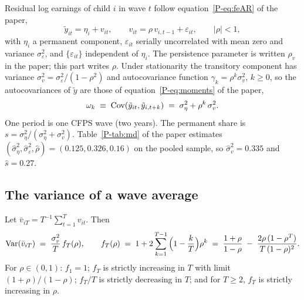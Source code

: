Residual log earnings of child $i$ in wave $t$ follow
equation~\eqref{P-eq:feAR} of the paper,
\begin{equation}
\tilde y_{it} = \eta_i + v_{it}, \qquad
v_{it} = \rho\, v_{i,t-1} + \varepsilon_{it}, \qquad |\rho| < 1,
\label{fr:eq:model}
\end{equation}
with $\eta_i$ a permanent component, $\varepsilon_{it}$ serially
uncorrelated with mean zero and variance $\sigma^2_\varepsilon$, and
$\{\varepsilon_{it}\}$ independent of $\eta_i$. The persistence parameter
is written $\rho_v$ in the paper; this part writes $\rho$. Under
stationarity the transitory component has variance
$\sigma^2_v = \sigma^2_\varepsilon/(1-\rho^2)$ and autocovariance function
$\gamma_k = \rho^{k}\sigma^2_v$, $k \ge 0$, so the autocovariances of
$\tilde y$ are those of equation~\eqref{P-eq:moments} of the paper,
\begin{equation}
\omega_k \;\equiv\; \mathrm{Cov}(\tilde y_{it}, \tilde y_{i,t+k}) \;=\; \sigma^2_\eta + \rho^{k}\,\sigma^2_v .
\label{fr:eq:omega}
\end{equation}
One period is one CFPS wave (two years). The permanent share is
$s = \sigma^2_\eta/(\sigma^2_\eta + \sigma^2_v)$. Table~\ref{P-tab:md} of
the paper estimates $(\hat\sigma^2_\eta, \hat\sigma^2_\varepsilon, \hat\rho) =
(0.125, 0.326, 0.16)$ on the pooled sample, so $\hat\sigma^2_v = 0.335$ and
$\hat s = 0.27$.

\subsection{The variance of a wave average}

\begin{proposition}
\label{fr:prop:fT}
Let $\bar v_{iT} = T^{-1}\sum_{t=1}^{T} v_{it}$. Then
\begin{equation}
\mathrm{Var}(\bar v_{iT}) \;=\; \frac{\sigma^2_v}{T}\, f_T(\rho), \qquad
f_T(\rho) \;=\; 1 + 2\sum_{k=1}^{T-1}\Big(1 - \frac{k}{T}\Big)\rho^{k}
\;=\; \frac{1+\rho}{1-\rho} \;-\; \frac{2\rho\,(1-\rho^{T})}{T\,(1-\rho)^{2}} .
\label{fr:eq:fT}
\end{equation}
For $\rho \in (0,1)$: $f_1 = 1$; $f_T$ is strictly increasing in $T$ with
limit $(1+\rho)/(1-\rho)$; $f_T/T$ is strictly decreasing in $T$; and for
$T \ge 2$, $f_T$ is strictly increasing in $\rho$.
\end{proposition}

